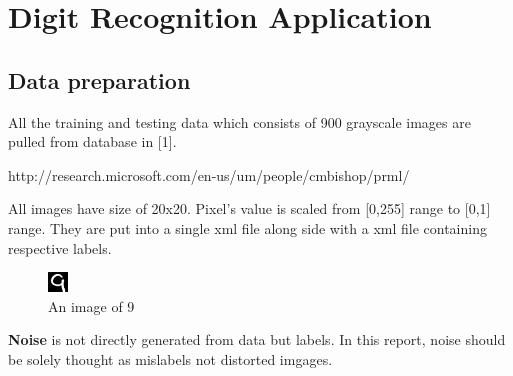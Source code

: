\documentclass[a4paper, 11pt]{article}
\begin{document}
\newpage
\section{Digit Recognition Application}
\subsection{Data preparation}
All the training and testing data which consists of 900 grayscale images are pulled from database in [1].
\begin{center}http://research.microsoft.com/en-us/um/people/cmbishop/prml/\end{center}
All images have size of 20x20. Pixel's value is scaled from [0,255] range to [0,1] range. They are put into a single xml file along side with a xml file containing respective labels.
\begin{figure}[ht]
  \centering
  \includegraphics[scale=5]{img0014}
  \caption{An image of 9}
  \label{fig:9}
\end{figure}
\textbf{Noise} is not directly generated from data but labels. In this report, noise should be solely thought as mislabels not distorted imgages.
\end{document}
